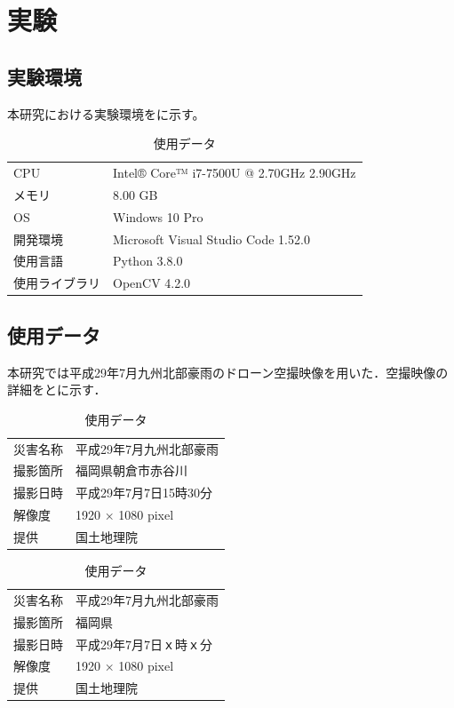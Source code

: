 \documentclass[../Thesis]{subfiles}
\begin{document}
\chapter{実験}
\section{実験環境}
本研究における実験環境をに示す。

\begin{table}[h]
  \centering
	\caption{使用データ}
	\label{tab01}
	\begin{tabular}{l l}
		\hline
		CPU & Intel® Core™ i7-7500U @ 2.70GHz 2.90GHz\\
		メモリ & 8.00 GB \\
		OS & Windows 10 Pro \\
		開発環境 & Microsoft Visual Studio Code 1.52.0 \\
		使用言語 & Python 3.8.0 \\
		使用ライブラリ & OpenCV 4.2.0 \\ \hline
	\end{tabular}
\end{table}

\section{使用データ}
本研究では平成29年7月九州北部豪雨のドローン空撮映像\cite{web02}を用いた．空撮映像の詳細をとに示す．

\begin{table}[h]
	\centering
	\caption{使用データ}
	\label{tab02}
	\begin{tabular}{l l}
		\hline
		災害名称 & 平成29年7月九州北部豪雨 \\
		撮影箇所 & 福岡県朝倉市赤谷川 \\
		撮影日時 & 平成29年7月7日15時30分 \\
		解像度 & 1920 × 1080 pixel\\
		提供 & 国土地理院 \\ \hline
	\end{tabular}
\end{table}

\begin{table}[h]
	\centering
	\caption{使用データ}
	\label{tab03}
	\begin{tabular}{l l}
		\hline
		災害名称 & 平成29年7月九州北部豪雨 \\
		撮影箇所 & 福岡県 \\
		撮影日時 & 平成29年7月7日ｘ時ｘ分 \\
		解像度 & 1920 × 1080 pixel\\
		提供 & 国土地理院 \\ \hline
	\end{tabular}
\end{table}
\end{document}
